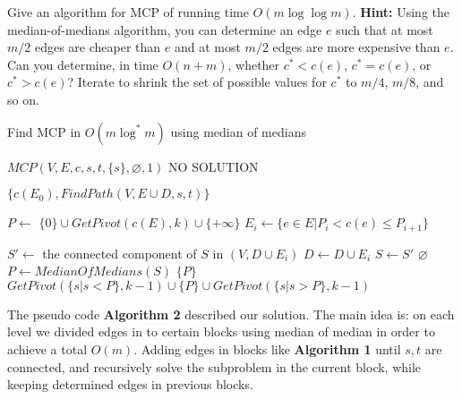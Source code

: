 \documentclass[11pt,a4paper,oneside]{article}
\begin{document}
\begin{problem}{2}
	\statement
	Give an algorithm for MCP of running time $O(m \log \log m)$. \textbf{Hint:} Using the median-of-medians algorithm,
	you can determine an edge $e$ such that at most $m/2$ edges are cheaper than $e$ and at most $m/2$ edges are
	more expensive than $e$. Can you determine, in time $O(n+m)$, whether $c^* < c(e)$, $c^* = c(e)$, or $c^* > c(e)$?
	Iterate to shrink the set of possible
	values for $c^*$ to $m/4$, $m/8$, and so on.

	\solution
	
	\begin{algorithm}
		\caption{Find MCP in $O(m \log^* m)$ using median of medians}
		\begin{algorithmic}[1]

					\State \Return $MCP(V, E, c, s, t, \{s\}, \varnothing, 1)$
				\Else
					\State \Return NO SOLUTION
				\EndIf
			\EndFunction

				\State \Return $\{c(E_0), FindPath(V, E \cup D, s, t)\}$
			\EndIf
			
			\State $P \gets$ $\{0\} \cup GetPivot(c(E), k) \cup  \{+\infty\}$ 
			\State $E_i \gets \{e \in E | P_i < c(e) \leq P_{i+1} \}$

				\State $S' \gets$ the connected component of $S$ in $(V, D \cup E_i)$
					\State {}
				\EndIf
				\State $D \gets D \cup E_i$
				\State $S \gets S'$
			\EndFor
			\EndFunction
					\State \Return $\varnothing$
				\EndIf
				\State $P \leftarrow MedianOfMedians(S)$
					\State \Return $\{P\}$
				\Else
					\State \Return $GetPivot(\{s | s < P\}, k - 1) \cup \{P\} \cup GetPivot(\{s | s > P\}, k - 1)$
				\EndIf
			\EndFunction
		\end{algorithmic}
	\end{algorithm}


	The pseudo code \textbf{Algorithm 2} described our solution. The main idea is: on each level we divided edges in to certain blocks using median of median in order to achieve a total $O(m)$. Adding edges in blocks like \textbf{Algorithm 1} until $s, t$ are connected, and recursively solve the subproblem in the current block, while keeping determined edges in previous blocks.


\end{problem}
\end{document}
